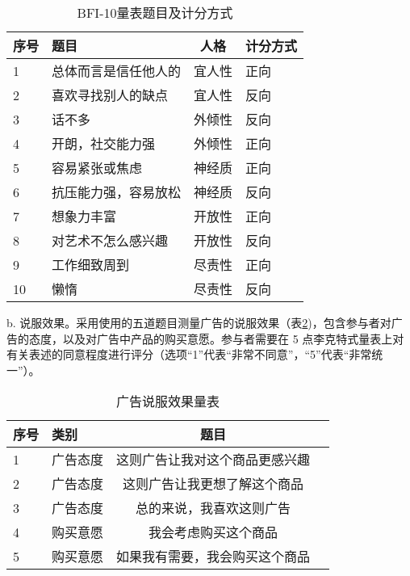 \begin{table}[H]
    \caption{\label{tab:BFI10-sample} BFI-10量表题目及计分方式}
    {\tablesongti %
    \renewcommand{\arraystretch}{1} %
    \begin{tabularx}{\linewidth}{lXc>{\centering\arraybackslash}X}
        \toprule %
        序号 & 题目 & 人格 & 计分方式 \\ 
        \midrule %
        1 & 总体而言是信任他人的 & 宜人性 & 正向 \\
        2 & 喜欢寻找别人的缺点   & 宜人性 & 反向 \\
        3 & 话不多              & 外倾性 & 反向 \\
        4 & 开朗，社交能力强     & 外倾性 & 正向 \\
        5 & 容易紧张或焦虑       & 神经质 & 正向 \\
        6 & 抗压能力强，容易放松 & 神经质 & 反向 \\
        7 & 想象力丰富           & 开放性 & 正向 \\
        8 & 对艺术不怎么感兴趣   & 开放性 & 反向 \\
        9 & 工作细致周到         & 尽责性 & 正向 \\
        10 & 懒惰               & 尽责性 & 反向 \\
        \bottomrule %
    \end{tabularx}}
\end{table}

b. 说服效果。采用\citet{hirsh2012personalized}使用的五道题目测量广告的说服效果（表\ref{tab:persuasionSurvey})，包含参与者对广告的态度，以及对广告中产品的购买意愿。参与者需要在 5 点李克特式量表上对有关表述的同意程度进行评分（选项“1”代表“非常不同意”，“5”代表“非常统一”）。

\begin{table}[htbp]
    \caption{\label{tab:persuasionSurvey}广告说服效果量表}
    {\tablesongti %
    \renewcommand{\arraystretch}{1.5} %
    \begin{tabularx}{\linewidth}{lXc>{\centering\arraybackslash}X}
        \toprule %
        序号 & 类别 & 题目 \\ 
        \midrule %
        1 & 广告态度 & 这则广告让我对这个商品更感兴趣 \\ 
        2 & 广告态度 & 这则广告让我更想了解这个商品 \\ 
        3 & 广告态度 & 总的来说，我喜欢这则广告 \\ 
        4 & 购买意愿 & 我会考虑购买这个商品 \\ 
        5 & 购买意愿 & 如果我有需要，我会购买这个商品 \\ 
        \bottomrule %
    \end{tabularx}
    }
\end{table}

